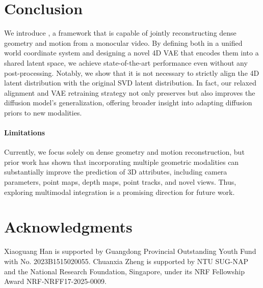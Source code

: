 \section{Conclusion}
\label{sec:conclusion}

We introduce \method,
a framework that is capable of jointly reconstructing dense geometry and motion from a monocular video.
By defining both in a unified world coordinate system
and designing a novel 4D VAE that encodes them into a shared latent space,
we achieve state-of-the-art performance even without any post-processing. 
Notably,
we show that it is not necessary to strictly align the 4D latent distribution with the original SVD latent distribution.
In fact,
our relaxed alignment and VAE retraining strategy not only preserves but also improves the diffusion model's generalization,
offering broader insight into adapting diffusion priors to new modalities.

\paragraph{Limitations}
Currently,
we focus solely on dense geometry and motion reconstruction,
but prior work has shown that incorporating multiple geometric modalities can substantially improve the prediction of 3D attributes, including camera parameters, point maps, depth maps, point tracks, and novel views.
Thus, exploring multimodal integration is a promising direction for future work.

\section*{Acknowledgments}
Xiaoguang Han is supported by Guangdong Provincial Outstanding Youth Fund with No. 2023B1515020055.
Chuanxia Zheng is supported by NTU SUG-NAP and the National Research Foundation, Singapore, under its NRF Fellowship Award NRF-NRFF17-2025-0009.
\\